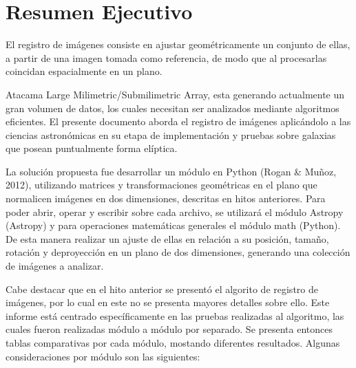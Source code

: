 \section{Resumen Ejecutivo}

El registro de imágenes consiste en ajustar geométricamente un
conjunto de ellas, a partir de una imagen tomada como referencia, de
modo que al procesarlas coincidan espacialmente en un plano.

Atacama Large Milimetric/Submilimetric Array, esta generando actualmente un gran
volumen de datos, los cuales necesitan ser analizados mediante algoritmos
eficientes.
El presente documento aborda el registro de imágenes aplicándolo a las ciencias
astronómicas en su etapa de implementación y pruebas sobre galaxias que posean 
puntualmente forma elíptica.

La solución propuesta fue desarrollar un módulo en Python (Rogan \&
Muñoz, 2012), utilizando matrices y transformaciones geométricas en el
plano que normalicen imágenes en dos dimensiones, descritas en hitos anteriores. 
Para poder abrir, operar y escribir sobre cada archivo, se utilizará el módulo Astropy
(Astropy) y para operaciones matemáticas generales el módulo math
(Python). De esta manera realizar un ajuste de ellas en relación a su
posición, tamaño, rotación y deproyección en un plano de dos
dimensiones, generando una colección de imágenes a analizar.

Cabe destacar que en el hito anterior se presentó el algorito de registro de imágenes, por lo cual en este no se presenta mayores detalles sobre ello. Este informe está centrado específicamente en las pruebas realizadas al algoritmo, las cuales fueron realizadas módulo a módulo por separado. Se presenta entonces tablas comparativas por cada módulo, mostando diferentes resultados. Algunas consideraciones por módulo son las siguientes:

